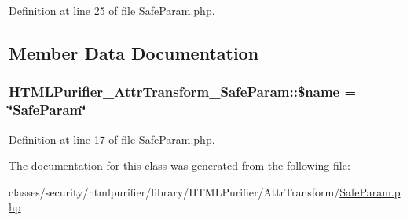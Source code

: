 Definition at line 25 of file Safe\+Param.\+php.



\subsection{Member Data Documentation}
\hypertarget{classHTMLPurifier__AttrTransform__SafeParam_af4fd8183836a1d11286a76a0851f6b14}{
\subsubsection[{\$name}]{\setlength{\rightskip}{0pt plus 5cm}H\+T\+M\+L\+Purifier\+\_\+\+Attr\+Transform\+\_\+\+Safe\+Param\+::\$name = \char`\"{}Safe\+Param\char`\"{}}}\label{classHTMLPurifier__AttrTransform__SafeParam_af4fd8183836a1d11286a76a0851f6b14}


Definition at line 17 of file Safe\+Param.\+php.



The documentation for this class was generated from the following file\+:\begin{DoxyCompactItemize}
\item 
classes/security/htmlpurifier/library/\+H\+T\+M\+L\+Purifier/\+Attr\+Transform/\hyperlink{SafeParam_8php}{Safe\+Param.\+php}\end{DoxyCompactItemize}
